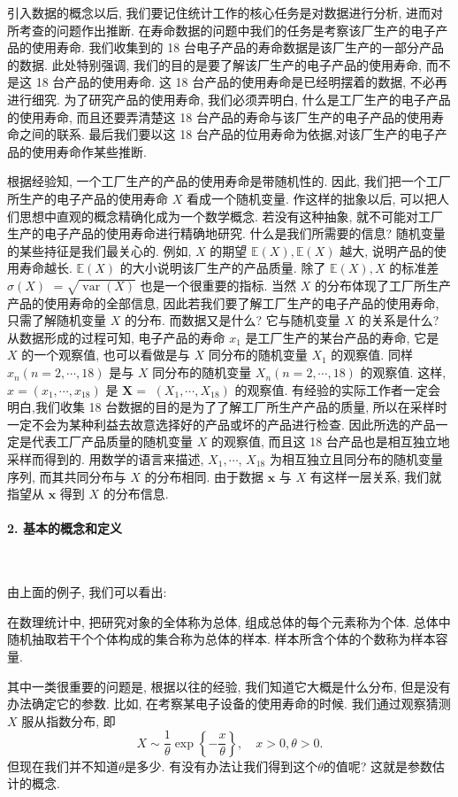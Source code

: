 引入数据的概念以后, 我们要记住统计工作的核心任务是对数据进行分析, 进而对所考查的问题作出推断. 在寿命数据的问题中我们的任务是考察该厂生产的电子产品的使用寿命. 我们收集到的 18 台电子产品的寿命数据是该厂生产的一部分产品的数据. 此处特别强调, 我们的目的是要了解该厂生产的电子产品的使用寿命, 而不是这 18 台产品的使用寿命. 这 18 台产品的使用寿命是已经明摆着的数据, 不必再进行细究. 为了研究产品的使用寿命, 我们必须弄明白, 什么是工厂生产的电子产品的使用寿命, 而且还要弄清楚这 18 台产品的寿命与该厂生产的电子产品的使用寿命之间的联系. 最后我们要以这 18 台产品的位用寿命为依据,对该厂生产的电子产品的使用寿命作某些推断. 

根据经验知, 一个工厂生产的产品的使用寿命是带随机性的. 因此, 我们把一个工厂所生产的电子产品的使用寿命 $X$ 看成一个随机变量. 作这样的拙象以后, 可以把人们思想中直观的概念精确化成为一个数学概念. 若没有这种抽象, 就不可能对工厂生产的电子产品的使用寿命进行精确地研究. 什么是我们所需要的信息? 随机变量的某些持征是我们最关心的. 例如, $X$ 的期望 $\mathbb{E}(X), \mathbb{E}(X)$ 越大, 说明产品的使用寿命越长. $\mathbb{E}(X)$ 的大小说明该厂生产的产品质量. 除了 $\mathbb{E}(X), X$ 的标准差 $\sigma(X)$ $=\sqrt{\operatorname{var}(X)}$ 也是一个很重要的指标. 当然 $X$ 的分布体现了工厂所生产产品的使用寿命的全部信息, 因此若我们要了解工厂生产的电子产品的使用寿命, 只需了解随机变量 $X$ 的分布. 而数据又是什么? 它与随机变量 $X$ 的关系是什么? 从数据形成的过程可知, 电子产品的寿命 $x_1$ 是工厂生产的某台产品的寿命, 它是 $X$ 的一个观察值, 也可以看做是与 $X$ 同分布的随机变量 $X_1$ 的观察值. 同样 $x_n(n=2, \cdots, 18)$ 是与 $X$ 同分布的随机变量 $X_n(n=2, \cdots, 18)$ 的观察值. 这样, $x=\left(x_1, \cdots, x_{18}\right)$ 是 $\boldsymbol{X}=$ $\left(X_1, \cdots, X_{18}\right)$ 的观察值. 有经验的实际工作者一定会明白,我们收集 18 台数据的目的是为了了解工厂所生产产品的质量, 所以在采样时一定不会为某种利益去故意选择好的产品或坏的产品进行检查. 因此所选的产品一定是代表工厂产品质量的随机变量 $X$ 的观察值, 而且这 18 台产品也是相互独立地采样而得到的. 用数学的语言来描述, $X_1, \cdots$, $X_{18}$ 为相互独立且同分布的随机变量序列, 而其共同分布与 $X$ 的分布相同. 由于数据 $\boldsymbol{x}$ 与 $X$ 有这样一层关系, 我们就指望从 $\boldsymbol{x}$ 得到 $X$ 的分布信息.

\paragraph{2. 基本的概念和定义}

~

由上面的例子, 我们可以看出: 

\begin{definition}
    在数理统计中, 把研究对象的全体称为总体, 组成总体的每个元素称为个体. 总体中随机抽取若干个个体构成的集合称为总体的样本. 样本所含个体的个数称为样本容量. 
\end{definition}

其中一类很重要的问题是, 根据以往的经验, 我们知道它大概是什么分布, 但是没有办法确定它的参数. 比如, 在考察某电子设备的使用寿命的时候. 我们通过观察猜测 $X$ 服从指数分布, 即
$$
X \sim \frac{1}{\theta} \exp \left\{-\frac{x}{\theta}\right\}, \quad x>0, \theta>0 .
$$
但现在我们并不知道$\theta$是多少. 有没有办法让我们得到这个$\theta$的值呢? 这就是参数估计的概念. 